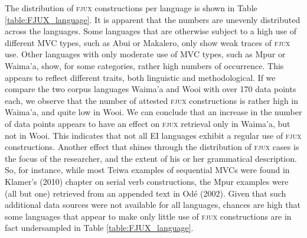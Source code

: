 The distribution of \textsc{fjux} constructions per language is shown in Table \ref{table:FJUX_language}. It is apparent that the numbers are unevenly distributed across the languages. Some languages that are otherwise subject to a high use of different MVC types, such as Abui or Makalero, only show weak traces of \textsc{fjux} use. Other languages with only moderate use of MVC types, such as Mpur or Waima'a, show, for some categories, rather high numbers of occurrence. This appears to reflect different traits, both linguistic and methodological. If we compare the two corpus languages Waima'a and Wooi with over 170 data points each, we observe that the number of attested \textsc{fjux} constructions is rather high in Waima'a, and quite low in Wooi. We can conclude that an increase in the number of data points appears to have an effect on \textsc{fjux} retrieval only in Waima'a, but not in Wooi. This indicates that not all EI languages exhibit a regular use of \textsc{fjux} constructions. Another effect that shines through the distribution of \textsc{fjux} cases is the focus of the researcher, and the extent of his or her grammatical description. So, for instance, while most Teiwa examples of sequential MVCs were found in Klamer's (2010) chapter on serial verb constructions, the Mpur examples were (all but one) retrieved from an appended text in Odé (2002). Given that such additional data sources were not available for all languages, chances are high that some languages that appear to make only little use of \textsc{fjux} constructions are in fact undersampled in Table \ref{table:FJUX_language}.


